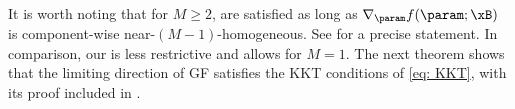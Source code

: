 

It is worth noting that for $M \ge 2$,  are satisfied as long as $\nabla_{\param} f(\param;\xB)$ is component-wise near-$(M-1)$-homogeneous. See  for a precise statement. In comparison, our  is less restrictive and allows for $M=1$.
The next theorem shows that the limiting direction of GF satisfies the KKT conditions of \eqref{eq: KKT}, with its proof included in . 

